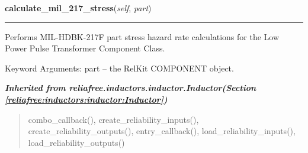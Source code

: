 \hspace{.8\funcindent}\begin{boxedminipage}{\funcwidth}

    \raggedright \textbf{calculate\_mil\_217\_stress}(\textit{self}, \textit{part})

    \vspace{-1.5ex}

    \rule{\textwidth}{0.5\fboxrule}
\setlength{\parskip}{2ex}
    Performs MIL-HDBK-217F part stress hazard rate calculations for the Low
    Power Pulse Transformer Component Class.

    Keyword Arguments: part -- the RelKit COMPONENT object.

\setlength{\parskip}{1ex}
    \end{boxedminipage}


\large{\textbf{\textit{Inherited from reliafree.inductors.inductor.Inductor\textit{(Section \ref{reliafree:inductors:inductor:Inductor})}}}}

\begin{quote}
combo\_callback(), create\_reliability\_inputs(), create\_reliability\_outputs(), entry\_callback(), load\_reliability\_inputs(), load\_reliability\_outputs()
\end{quote}

